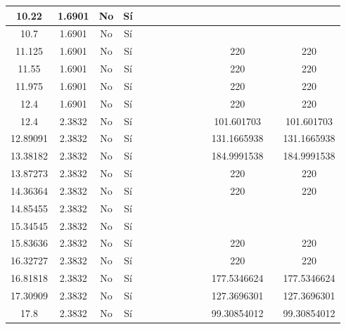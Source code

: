 \begin{table}[H]
{\begin{tabular}{|c|c|c|c|c|c|c|c|c|c|c|c|c|c|}
\hline
10.22 & 1.6901 & No  & Sí  &     &     &     &     &     &     &     &     &     &  \bigstrut\\
\hline
10.7 & 1.6901 & No  & Sí  &     &     &     &     &     &     &     &     &     &  \bigstrut\\
\hline
11.125 & 1.6901 & No  & Sí  &     &     &     &     &     &     &     & 220 &     & 220 \bigstrut\\
\hline
11.55 & 1.6901 & No  & Sí  &     &     &     &     &     &     &     & 220 &     & 220 \bigstrut\\
\hline
11.975 & 1.6901 & No  & Sí  &     &     &     &     &     &     &     & 220 &     & 220 \bigstrut\\
\hline
12.4 & 1.6901 & No  & Sí  &     &     &     &     &     &     &     & 220 &     & 220 \bigstrut\\
\hline
12.4 & 2.3832 & No  & Sí  &     &     &     &     &     &     &     & 101.601703 &     & 101.601703 \bigstrut\\
\hline
12.89091 & 2.3832 & No  & Sí  &     &     &     &     &     &     &     & 131.1665938 &     & 131.1665938 \bigstrut\\
\hline
13.38182 & 2.3832 & No  & Sí  &     &     &     &     &     &     &     & 184.9991538 &     & 184.9991538 \bigstrut\\
\hline
13.87273 & 2.3832 & No  & Sí  &     &     &     &     &     &     &     & 220 &     & 220 \bigstrut\\
\hline
14.36364 & 2.3832 & No  & Sí  &     &     &     &     &     &     &     & 220 &     & 220 \bigstrut\\
\hline
14.85455 & 2.3832 & No  & Sí  &     &     &     &     &     &     &     &     &     &  \bigstrut\\
\hline
15.34545 & 2.3832 & No  & Sí  &     &     &     &     &     &     &     &     &     &  \bigstrut\\
\hline
15.83636 & 2.3832 & No  & Sí  &     &     &     &     &     &     &     & 220 &     & 220 \bigstrut\\
\hline
16.32727 & 2.3832 & No  & Sí  &     &     &     &     &     &     &     & 220 &     & 220 \bigstrut\\
\hline
16.81818 & 2.3832 & No  & Sí  &     &     &     &     &     &     &     & 177.5346624 &     & 177.5346624 \bigstrut\\
\hline
17.30909 & 2.3832 & No  & Sí  &     &     &     &     &     &     &     & 127.3696301 &     & 127.3696301 \bigstrut\\
\hline
17.8 & 2.3832 & No  & Sí  &     &     &     &     &     &     &     & 99.30854012 &     & 99.30854012 \bigstrut\\

\end{tabular}}
\end{table}
